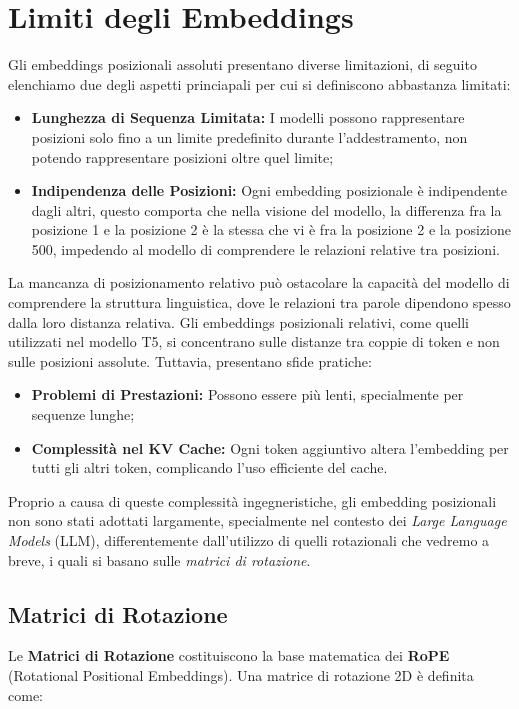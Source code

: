 \section{Limiti degli Embeddings}
Gli embeddings posizionali assoluti presentano diverse limitazioni, di seguito elenchiamo due degli aspetti princiapali per cui si definiscono abbastanza limitati:

\begin{itemize}
    \item \textbf{Lunghezza di Sequenza Limitata:} I modelli possono rappresentare posizioni solo fino a un limite predefinito durante l'addestramento, non potendo rappresentare posizioni oltre quel limite;
    \item \textbf{Indipendenza delle Posizioni:} Ogni embedding posizionale è indipendente dagli altri, questo comporta che nella visione del modello, la differenza fra la posizione 1 e la posizione 2 è la stessa che vi è fra la posizione 2 e la posizione 500, impedendo al modello di comprendere le relazioni relative tra posizioni.
\end{itemize}

La mancanza di posizionamento relativo può ostacolare la capacità del modello di comprendere la struttura linguistica, dove le relazioni tra parole dipendono spesso dalla loro distanza relativa. Gli embeddings posizionali relativi, come quelli utilizzati nel modello T5, si concentrano sulle distanze tra coppie di token e non sulle posizioni assolute. Tuttavia, presentano sfide pratiche:

\begin{itemize}
    \item \textbf{Problemi di Prestazioni:} Possono essere più lenti, specialmente per sequenze lunghe;
    \item \textbf{Complessità nel KV Cache:} Ogni token aggiuntivo altera l'embedding per tutti gli altri token, complicando l'uso efficiente del cache.
\end{itemize}

Proprio a causa di queste complessità ingegneristiche, gli embedding posizionali non sono stati adottati largamente, specialmente nel contesto dei \textit{Large Language Models} (LLM), differentemente dall'utilizzo di quelli rotazionali che vedremo a breve, i quali si basano sulle \textit{matrici di rotazione}.

\subsection{Matrici di Rotazione}
Le \textbf{Matrici di Rotazione} costituiscono la base matematica dei \textbf{RoPE} (Rotational Positional Embeddings). Una matrice di rotazione 2D è definita come:

